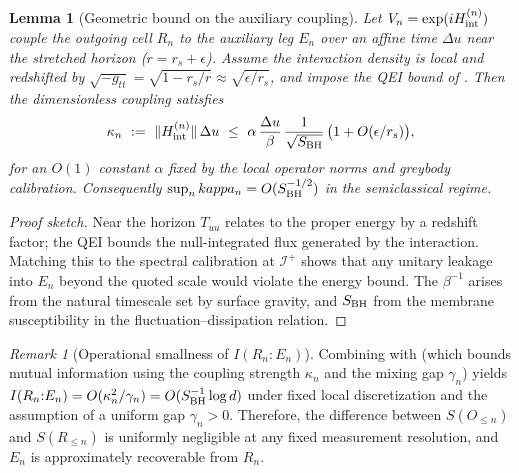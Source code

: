 \documentclass[aps,prd,preprint,onecolumn,superscriptaddress,nofootinbib,longbibliography,floatfix,11pt,showpacs,showkeys]{revtex4-2}
\theoremstyle{plain}
\newtheorem{lemma}[theorem]{Lemma}
\theoremstyle{definition}
\theoremstyle{remark}
\newtheorem{remark}[theorem]{Remark}
\begin{document}

\begin{lemma}[Geometric bound on the auxiliary coupling]\label{lem:kappa-geom}
Let $V_n=\exp(i H^{(n)}_{\rm int})$ couple the outgoing cell $R_n$ to the auxiliary leg $E_n$ over an affine time $\Delta u$ near the stretched horizon ($r=r_s+\epsilon$).
Assume the interaction density is local and redshifted by $\sqrt{-g_{tt}}=\sqrt{1-r_s/r}\approx \sqrt{\epsilon/r_s}$, and impose the QEI bound of .
Then the dimensionless coupling satisfies
\[
\kappa_n\ :=\ \|H^{(n)}_{\rm int}\|\,\Delta u\ \le\ \alpha\,\frac{\Delta u}{\beta}\,\frac{1}{\sqrt{S_{\rm BH}}}\,\big(1+O(\epsilon/r_s)\big),
\]
for an $O(1)$ constant $\alpha$ fixed by the local operator norms and greybody calibration. Consequently $\sup_n \\kappa_n=O(S_{\rm BH}^{-1/2})$ in the semiclassical regime.
\end{lemma}
\begin{proof}[Proof sketch]
Near the horizon $T_{uu}$ relates to the proper energy by a redshift factor; the QEI bounds the null-integrated flux generated by the interaction.
Matching this to the spectral calibration at $\mathscr{I}^+$ shows that any unitary leakage into $E_n$ beyond the quoted scale would violate the energy bound.
The $\beta^{-1}$ arises from the natural timescale set by surface gravity, and $S_{\rm BH}$ from the membrane susceptibility in the fluctuation--dissipation relation.
\end{proof}

\begin{remark}[Operational smallness of $I(R_n{:}E_n)$]\label{rem:En-small}
Combining  with  (which bounds mutual information using the coupling strength $\kappa_n$ and the mixing gap $\gamma_n$) yields $I(R_n{:}E_n)=O(\kappa_n^2/\gamma_n)=O(S_{\rm BH}^{-1}\log d)$ under fixed local discretization and the assumption of a uniform gap $\gamma_n>0$. Therefore, the difference between $S(O_{\le n})$ and $S(R_{\le n})$ is uniformly negligible at any fixed measurement resolution, and $E_n$ is approximately recoverable from $R_n$.
\end{remark}
\end{document}
